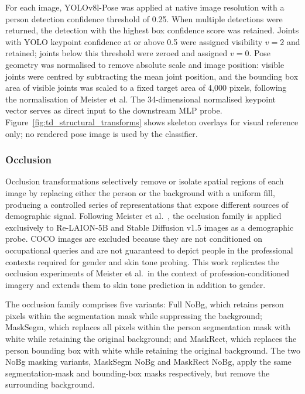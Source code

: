 For each image, YOLOv8l-Pose was applied at native image resolution with a person detection confidence threshold of 0.25. When multiple detections were returned, the detection with the highest box confidence score was retained. Joints with YOLO keypoint confidence at or above 0.5 were assigned visibility $v = 2$ and retained; joints below this threshold were zeroed and assigned $v = 0$. Pose geometry was normalised to remove absolute scale and image position: visible joints were centred by subtracting the mean joint position, and the bounding box area of visible joints was scaled to a fixed target area of 4,000 pixels, following the normalisation of Meister et al. The 34-dimensional normalised keypoint vector serves as direct input to the downstream MLP probe. Figure~\ref{fig:td_structural_transforms} shows skeleton overlays for visual reference only; no rendered pose image is used by the classifier.

\subsubsection{Occlusion}
\label{subsec:occlusion}

Occlusion transformations selectively remove or isolate spatial regions of each image by replacing either the person or the background with a uniform fill, producing a controlled series of representations that expose different sources of demographic signal. Following Meister et al.\ \cite{Meister_2023_GenderArtifactsinVisualDatasets}, the occlusion family is applied exclusively to Re-LAION-5B and Stable Diffusion v1.5 images as a demographic probe. COCO images are excluded because they are not conditioned on occupational queries and are not guaranteed to depict people in the professional contexts required for gender and skin tone probing. This work replicates the occlusion experiments of Meister et al.\ in the context of profession-conditioned imagery and extends them to skin tone prediction in addition to gender.

The occlusion family comprises five variants: Full NoBg, which retains person pixels within the segmentation mask while suppressing the background; MaskSegm, which replaces all pixels within the person segmentation mask with white while retaining the original background; and MaskRect, which replaces the person bounding box with white while retaining the original background. The two NoBg masking variants, MaskSegm NoBg and MaskRect NoBg, apply the same segmentation-mask and bounding-box masks respectively, but remove the surrounding background.

